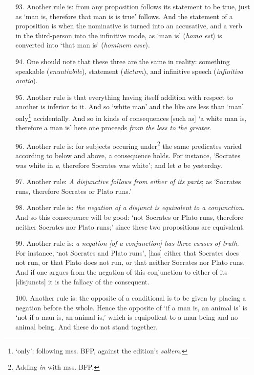 \documentclass[]{article}
\begin{document}
\begin{itemize}
\item[93.] Another rule is: from any proposition follows its statement to be true, just as `man is, therefore that man is is true' follows. And the statement of a proposition is when the nominative is turned into an accusative, and a verb in the third-person into the infinitive mode, as `man is' (\textit{homo est}) is converted into `that man is' (\textit{hominem esse}).
\item[94.] One should note that these three are the same in reality: something speakable (\textit{enuntiabile}), statement (\textit{dictum}), and infinitive speech (\textit{infinitiva oratio}).
\item[95.] Another rule is that everything having itself addition with respect to another is inferior to it. And so `white man' and the like are less than `man' only\footnote{`only': following mss. BFP, against the edition's \textit{saltem}.}  accidentally. And so in kinds of consequences [such as] `a white man is, therefore a man is' here one proceeds \textit{from the less to the greater}.
\item[96.] Another rule is: for subjects occuring under\footnote{Adding \textit{in} with mss. BFP.} the same predicates varied according to below and above, a consequence holds. For instance, `Socrates was white in \textit{a}, therefore Socrates was white'; and let \textit{a} be yesterday.
\item[97.] Another rule: \textit{A disjunctive follows from either of its parts}; as `Socrates runs, therefore Socrates or Plato runs.'
\item[98.] Another rule is: \textit{the negation of a disjunct is equivalent to a conjunction}. And so this consequence will be good: `not Socrates or Plato runs, therefore neither Socrates nor Plato runs;' since these two propositions are equivalent.
\item[99.] Another rule is: \textit{a negation [of a conjunction] has three causes of truth}. For instance, `not Socrates and Plato runs', [has] either that Socrates does not run, or that Plato does not run, or that neither Socrates nor Plato runs. And if one argues from the negation of this conjunction to either of its [disjuncts] it is the fallacy of the consequent.
\item[100.] Another rule is: the opposite of a conditional is to be given by placing a negation before the whole. Hence the opposite of `if a man is, an animal is' is `not if a man is, an animal is,' which is equipollent to a man being and no animal being. And these do not stand together.

\end{itemize}
\end{document}
